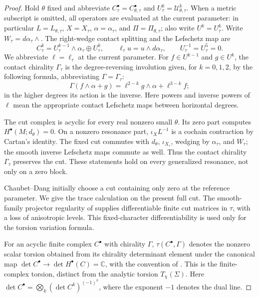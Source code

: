 \documentclass[11pt,letterpaper,reqno]{amsart}
\theoremstyle{remark}
\newcommand{\cU}{\mathcal U}
\begin{document}
\begin{proof}
Hold $\theta$ fixed and abbreviate
$C^\bullet_\tau=C^\bullet_{\theta,\tau}$ and
$U^k_\tau=\cU^k_{\theta,\tau}$. When a metric subscript is omitted,
all operators are evaluated at the current parameter: in particular
$L=L_{\theta,\tau}$, $X=X_\tau$, $\alpha=\alpha_\tau$, and
$\Pi=\Pi_{\theta,\tau}$; also write $U^k=U^k_\tau$.
Write $W_\tau=d\alpha_\tau\wedge$.
The right-wedge contact splitting and the Lefschetz map are
\[
 C^k_\tau=U^{k-1}_\tau\wedge\alpha_\tau\oplus U^k_\tau,
 \qquad \ell_\tau u=u\wedge d\alpha_\tau,
 \qquad U^{-1}_\tau=U^5_\tau=0.
\]
We abbreviate $\ell=\ell_\tau$ at the current parameter.
For $f\in U^{k-1}$ and $g\in U^k$, the contact chirality
$\Gamma_\tau$ is the degree-reversing involution given, for
$k=0,1,2$, by the following formula, abbreviating $\Gamma=\Gamma_\tau$:
\begin{equation}\label{xp:contact-chirality}
 \Gamma(f\wedge\alpha+g)
       =\ell^{2-k}g\wedge\alpha+\ell^{3-k}f;
\end{equation}
in the higher degrees its action is the inverse. Here powers and
inverse powers of $\ell$ mean the appropriate contact Lefschetz
maps between horizontal degrees.

The cut complex is acyclic for every real nonzero small $\theta$.
Its zero part computes $H^\bullet(M;d_\theta)=0$. On a nonzero
resonance part, $\iota_XL^{-1}$ is a cochain contraction by Cartan's
identity. The fixed cut commutes with $d_\theta$, $\iota_{X_\tau}$,
wedging by $\alpha_\tau$, and $W_\tau$; the smooth inverse Lefschetz
maps commute as well. Thus the contact chirality $\Gamma_\tau$
preserves the cut. These statements hold on every generalized
resonance, not only on a zero block.

Chaubet--Dang initially choose a cut containing only zero at the
reference parameter. We give the trace calculation on the present
full cut. The smooth-family projector regularity of
\cite[Proposition 7.2 and Appendix B]{CD} supplies differentiable
finite cut matrices in \(\tau\), with a loss of anisotropic levels.
This fixed-character differentiability is used only for the torsion
variation formula.

For an acyclic finite complex $C^\bullet$ with chirality $\Gamma$,
$\tau(C^\bullet,\Gamma)$ denotes the nonzero scalar torsion obtained
from its chirality determinant element under the canonical map
$\det C^\bullet\to\det H^\bullet(C)=\mathbb C$, with the convention
of \cite{CD}. This is the finite-complex torsion, distinct from the
analytic torsion $T_\chi(\Sigma)$. Here
$\det C^\bullet=\bigotimes_k(\det C^k)^{(-1)^k}$, where the
exponent $-1$ denotes the dual line.


\end{proof}
\end{document}
